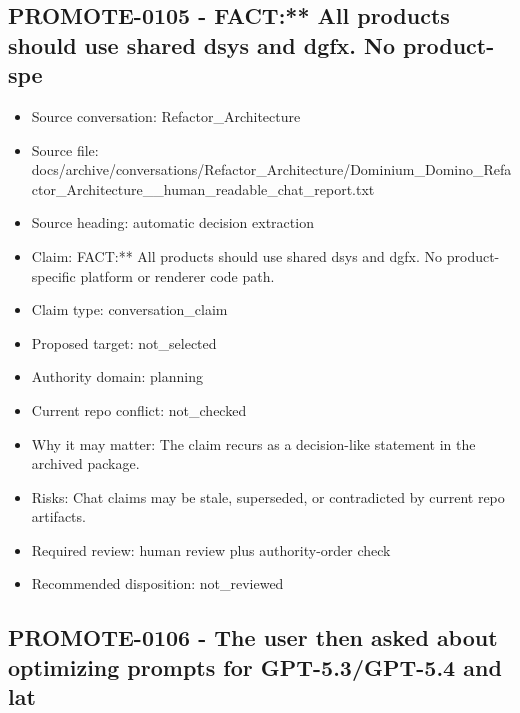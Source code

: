 \documentclass[11pt,a4paper]{report}
\begin{document}
\subsection{PROMOTE-0105 - FACT:** All products should use shared dsys and dgfx. No product-spe}

\begin{itemize}
\item Source conversation: Refactor\_Architecture
\item Source file: docs/archive/conversations/Refactor\_Architecture/Dominium\_Domino\_Refactor\_Architecture\_\_human\_readable\_chat\_report.txt
\item Source heading: automatic decision extraction
\item Claim: FACT:** All products should use shared dsys and dgfx. No product-specific platform or renderer code path.
\item Claim type: conversation\_claim
\item Proposed target: not\_selected
\item Authority domain: planning
\item Current repo conflict: not\_checked
\item Why it may matter: The claim recurs as a decision-like statement in the archived package.
\item Risks: Chat claims may be stale, superseded, or contradicted by current repo artifacts.
\item Required review: human review plus authority-order check
\item Recommended disposition: not\_reviewed
\end{itemize}

\subsection{PROMOTE-0106 - The user then asked about optimizing prompts for GPT-5.3/GPT-5.4 and lat}
\end{document}
